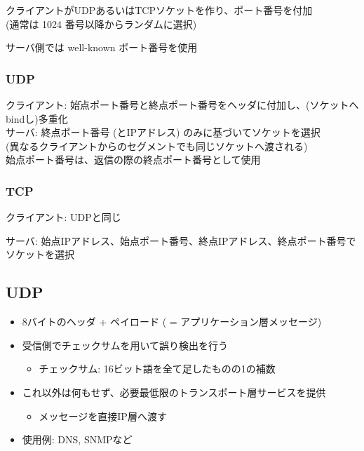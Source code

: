 クライアントがUDPあるいはTCPソケットを作り、ポート番号を付加\\
\indent(通常は 1024 番号以降からランダムに選択)

サーバ側では well-known ポート番号を使用


\subsubsection{UDP}



\begin{tabbing}

クライアント: \=始点ポート番号と終点ポート番号をヘッダに付加し、(ソケットへbindし)多重化\\
サーバ: \>終点ポート番号 (とIPアドレス) のみに基づいてソケットを選択\\
        \>(異なるクライアントからのセグメントでも同じソケットへ渡される)\\
        \>始点ポート番号は、返信の際の終点ポート番号として使用
\end{tabbing}



\subsubsection{TCP}

クライアント: UDPと同じ

サーバ: 始点IPアドレス、始点ポート番号、終点IPアドレス、終点ポート番号でソケットを選択


\subsection{UDP}

\begin{itemize}
  \item 8バイトのヘッダ + ペイロード ( = アプリケーション層メッセージ)

  

  \item 受信側でチェックサムを用いて誤り検出を行う
  \begin{itemize}
    \item[] チェックサム: 16ビット語を全て足したものの1の補数
  \end{itemize}
  \item これ以外は何もせず、必要最低限のトランスポート層サービスを提供
  \begin{itemize}
    \item メッセージを直接IP層へ渡す
  \end{itemize}
  \item[] 使用例: DNS, SNMPなど
\end{itemize}

